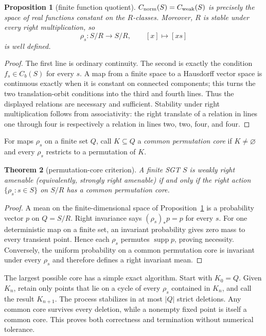 \documentclass[11pt]{article}
\newtheorem{theorem}{Theorem}
\newtheorem{proposition}[theorem]{Proposition}
\begin{document}
\begin{proposition}[finite function quotient]\label{prop:quotient}
$C_{\rm norm}(S)=C_{\rm weak}(S)$ is precisely the space of real functions
constant on the $R$-classes.  Moreover, $R$ is stable under every right
multiplication, so
\[
   \rho_s:S/R\longrightarrow S/R,\qquad [x]\longmapsto[xs]
\]
is well defined.
\end{proposition}

\begin{proof}
The first line is ordinary continuity.  The second is exactly the condition
$f_s\in C_b(S)$ for every $s$.  A map from a finite space to a Hausdorff vector
space is continuous exactly when it is constant on connected components; this
turns the two translation-orbit conditions into the third and fourth lines.
Thus the displayed relations are necessary and sufficient.  Stability under
right multiplication follows from associativity: the right translate of a
relation in lines one through four is respectively a relation in lines two,
two, four, and four.
\end{proof}

For maps $\rho_s$ on a finite set $Q$, call $K\subseteq Q$ a \emph{common
permutation core} if $K\ne\varnothing$ and every $\rho_s$ restricts to a
permutation of $K$.

\begin{theorem}[permutation-core criterion]\label{thm:core}
A finite SGT $S$ is weakly right amenable (equivalently, strongly right
amenable) if and only if the right action $\{\rho_s:s\in S\}$ on $S/R$ has a
common permutation core.
\end{theorem}

\begin{proof}
A mean on the finite-dimensional space of Proposition~\ref{prop:quotient} is a
probability vector $p$ on $Q=S/R$.  Right invariance says
$(\rho_s)_*p=p$ for every $s$.  For one deterministic map on a finite set, an
invariant probability gives zero mass to every transient point.  Hence each
$\rho_s$ permutes $\operatorname{supp}p$, proving necessity.  Conversely, the
uniform probability on a common permutation core is invariant under every
$\rho_s$ and therefore defines a right invariant mean.
\end{proof}

The largest possible core has a simple exact algorithm.  Start with $K_0=Q$.
Given $K_n$, retain only points that lie on a cycle of every $\rho_s$ contained
in $K_n$, and call the result $K_{n+1}$.  The process stabilizes in at most
$|Q|$ strict deletions.  Any common core survives every deletion, while a
nonempty fixed point is itself a common core.  This proves both correctness and
termination without numerical tolerance.
\end{document}
